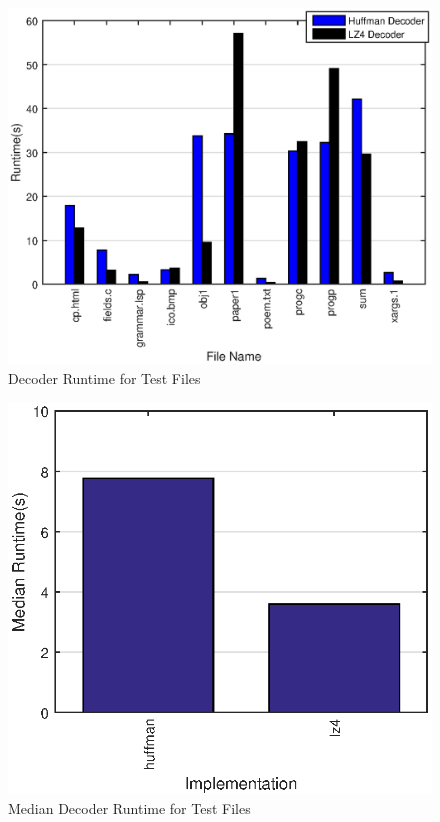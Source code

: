 \documentclass[12pt]{article}
\begin{document}
\begin{figure}[H]
	\centering
	\includegraphics[width=6.0in]{decoder_file_time}
	\caption{Decoder Runtime for Test Files}
	\label{fig:decoder_file_time}
	\setlength{\floatsep}{0pt}
\end{figure}
\begin{figure}[H]
	\centering
	\includegraphics[trim={0 0 0 1cm}, width=4.5in]{decoder_average_time}
	\caption{Median Decoder Runtime for Test Files}
	\label{fig:decoder_average_time}
\end{figure}
\end{document}
